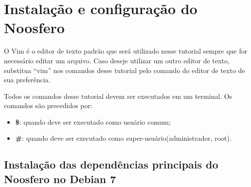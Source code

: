 \lstset{language=sh, numbers=none, breaklines=true}


\chapter{Instalação e configuração do Noosfero }

O Vim é o editor de texto padrão que será utilizado nesse tutorial sempre que for necessário editar um arquivo. Caso deseje utilizar um outro editor de texto, substitua “vim” nos comandos desse tutorial pelo comando do editor de texto de sua preferência.

Todos os comandos desse tutorial devem ser executados em um terminal. Os comandos são precedidos por:

\begin{itemize}
\item \textbf{\$}: quando deve ser executado como usuário comum;
\item \textbf{\#}: quando deve ser executado como super-usuário(administrador, root).
\end{itemize}

\section{Instalação das dependências principais do Noosfero no Debian 7}

